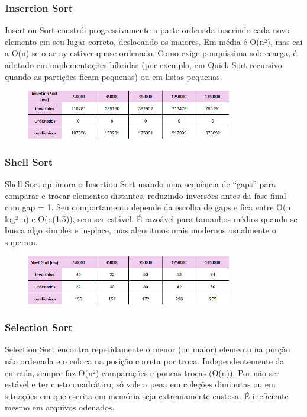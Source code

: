 \documentclass[a4paper, 12pt]{article}
\begin{document}
        \subsubsection{Insertion Sort}
            Insertion Sort constrói progressivamente a parte ordenada inserindo cada novo elemento em seu lugar correto, deslocando os maiores. Em média é O(n²), mas cai a O(n) se o array estiver quase ordenado. Como exige pouquíssima sobrecarga, é adotado em implementações híbridas (por exemplo, em Quick Sort recursivo quando as partições ficam pequenas) ou em listas pequenas.

            \begin{figure}[ht]
                \centering
                \includegraphics[width=0.8\textwidth]{images/insertion.png}
            \end{figure}

        \subsubsection{Shell Sort}
            Shell Sort aprimora o Insertion Sort usando uma sequência de “gaps” para comparar e trocar elementos distantes, reduzindo inversões antes da fase final com gap = 1. Seu comportamento depende da escolha de gaps e fica entre O(n log² n) e O(n(1.5)), sem ser estável. É razoável para tamanhos médios quando se busca algo simples e in-place, mas algoritmos mais modernos usualmente o superam.

            \begin{figure}[ht]
                \centering
                \includegraphics[width=0.8\textwidth]{images/shell.png}
            \end{figure}

        \subsubsection{Selection Sort}
            Selection Sort encontra repetidamente o menor (ou maior) elemento na porção não ordenada e o coloca na posição correta por troca. Independentemente da entrada, sempre faz O(n²) comparações e poucas trocas (O(n)). Por não ser estável e ter custo quadrático, só vale a pena em coleções diminutas ou em situações em que escrita em memória seja extremamente custosa. É ineficiente mesmo em arquivos odenados.
\end{document}
